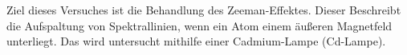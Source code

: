  Ziel dieses Versuches ist die Behandlung des Zeeman-Effektes.
 Dieser Beschreibt die Aufspaltung von Spektrallinien, wenn ein Atom einem äußeren Magnetfeld unterliegt.
Das wird untersucht mithilfe einer Cadmium-Lampe (Cd-Lampe).